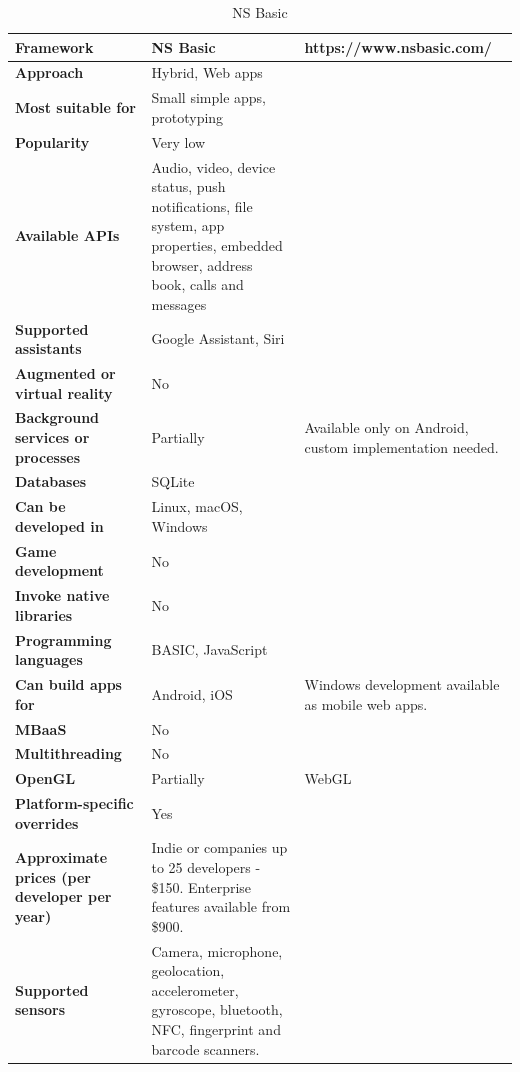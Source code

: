 \documentclass[english,master,public,dept460,male,cpdeclaration,oneside]{diploma}
\begin{document}
\begin{table}[!h]
	\centering
	\caption{NS Basic}
	\begin{tabular}{p{} | p{} | p{}}
		\toprule		
		\textbf{Framework} & \textbf{NS Basic} & https://www.nsbasic.com/ \\
		\midrule
		\textbf{Approach} & Hybrid, Web apps & \\			
		\midrule	
		\textbf{Most suitable for} & Small simple apps, prototyping & \\
		\midrule
		\textbf{Popularity} & Very low & \\			
		\midrule
		\textbf{Available APIs} & Audio, video, device status, push notifications, file system, app properties, embedded browser, address book, calls and messages & \\			
		\midrule
		\textbf{Supported assistants} & Google Assistant, Siri & \\			
		\midrule
		\textbf{Augmented or virtual reality} & No & \\			
		\midrule
		\textbf{Background services or processes} & Partially & Available only on Android, custom implementation needed. \\			
		\midrule
		\textbf{Databases} & SQLite & \\			
		\midrule
		\textbf{Can be developed in} & Linux, macOS, Windows &  \\			
		\midrule
		\textbf{Game development} & No & \\			
		\midrule
		\textbf{Invoke native libraries} & No & \\			
		\midrule
		\textbf{Programming languages} & BASIC, JavaScript & \\			
		\midrule
		\textbf{Can build apps for} & Android, iOS & Windows development available as mobile web apps. \\			
		\midrule
		\textbf{MBaaS} & No & \\			
		\midrule
		\textbf{Multithreading} & No & \\			
		\midrule
		\textbf{OpenGL} & Partially & WebGL \\			
		\midrule
		\textbf{Platform-specific overrides} & Yes & \\			
		\midrule
		\textbf{Approximate prices (per developer per year)} & Indie or companies up to 25 developers - \$150. Enterprise features available from \$900. & \\			
		\midrule
		\textbf{Supported sensors} & Camera, microphone, geolocation, accelerometer, gyroscope, bluetooth, NFC, fingerprint and barcode scanners. & \\			
		\midrule
	\end{tabular}
\end{table}
\end{document}
